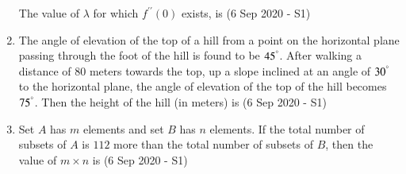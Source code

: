 \documentclass[journal]{IEEEtran}
\begin{document}
\begin{enumerate}
    The value of $\lambda$ for which $f^{\prime\prime}(0)$ exists, is \hfill (6 Sep 2020 - S1) \\ 
    
    \item The angle of elevation of the top of a hill from a point on the horizontal plane passing through the foot of the hill is found to be $45^\degree$. After walking a distance of $80$ meters towards the top, up a slope inclined at an angle of $30^\degree$ to the horizontal plane, the angle of elevation of the top of the hill becomes $75^\degree$. Then the height of the hill (in meters) is \hfill (6 Sep 2020 - S1) \\
    
    \item Set $A$ has $m$ elements and set $B$ has $n$ elements. If the total number of subsets of $A$ is $112$ more than the total number of subsets of $B$, then the value of $m\times n$ is \hfill (6 Sep 2020 - S1)
\end{enumerate}
\end{document}
